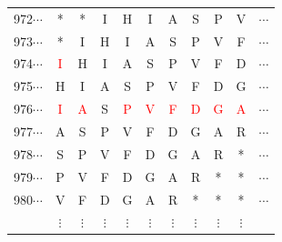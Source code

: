 \documentclass[phd,tocprelim]{cornell}
\begin{document}
\begin{table}[htp]
\begin{center}
{\begin{tabular}{|ccccccccccc|}
\small{972}$\cdots$ & * & * & I & H & I & A & S & P & V & $\cdots$ \\                                                                                  
\small{973}$\cdots$ & * & I & H & I & A & S & P & V & F & $\cdots$ \\                                                                                  
\small{974}$\cdots$ & \textcolor{red}{I} & H & I & A & S & P & V & F & D & $\cdots$ \\                                                                 
\small{975}$\cdots$ & H & I & A & S & P & V & F & D & G & $\cdots$ \\
\small{976}$\cdots$ & \textcolor{red}{I} & \textcolor{red}{A} & S & \textcolor{red}{P} & \textcolor{red}{V} & \textcolor{red}{F} & \textcolor{red}{D} & \textcolor{red}{G} & \textcolor{red}{A} &  $\cdots$ \\
\small{977}$\cdots$ & A & S & P & V & F & D & G & A & R & $\cdots$ \\
\small{978}$\cdots$ & S & P & V & F & D & G & A & R & * & $\cdots$ \\
\small{979}$\cdots$ & P & V & F & D & G & A & R & * & * & $\cdots$ \\
\small{980}$\cdots$ & V & F & D & G & A & R & * & * & * & $\cdots$ \\
 & $\vdots$ &  $\vdots$ &  $\vdots$ &  $\vdots$ & $\vdots$ &  $\vdots$ &  $\vdots$ &  $\vdots$&  $\vdots$ & \\
\hline
\end{tabular}
}
\end{center}
\end{table}
\end{document}
